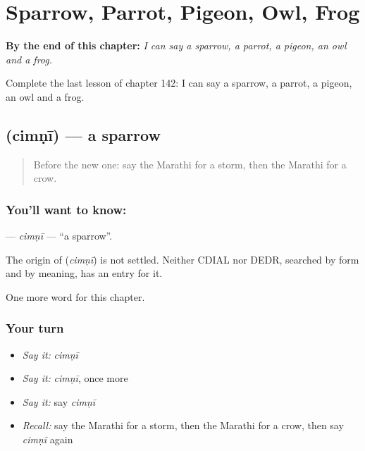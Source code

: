 
\chapter{Sparrow, Parrot, Pigeon, Owl, Frog}
\label{ch:mr-sparrow-parrot-pigeon-owl-frog}

\begin{chapteropening}
\textbf{By the end of this chapter:} \emph{I can say a sparrow, a parrot, a pigeon, an owl and a frog.}

Complete the last lesson of chapter 142: I can say a sparrow, a parrot, a pigeon, an owl and a frog.
\end{chapteropening}

\section[\texorpdfstring{\mr{चिमणी} (cimṇī)}{चिमणी (cimṇī)}]{ (cimṇī) — a sparrow}

\label{lesson:MR-C142-cimni}



\begin{quote}
Before the new one: say the Marathi for a storm, then the Marathi for a crow.
\end{quote}

\subsection*{You'll want to know: }
\textbf{} — \emph{cimṇī} — \textquotedblleft{}a sparrow\textquotedblright{}.

\begin{cousinweb}
The origin of \textbf{} (\emph{cimṇī}) is not settled. Neither CDIAL nor DEDR, searched by form and by meaning, has an entry for it.
\end{cousinweb}

\begin{grammarlens}[title={What you've built}]
One more word for this chapter.
\end{grammarlens}

\subsection*{Your turn}
\begin{itemize}
\raggedright
  \item \emph{Say it:} \emph{cimṇī}
  \item \emph{Say it:} \emph{cimṇī}, once more
  \item \emph{Say it:} say \emph{cimṇī}
  \item \emph{Recall:} say the Marathi for a storm, then the Marathi for a crow, then say \emph{cimṇī} again
\end{itemize}

